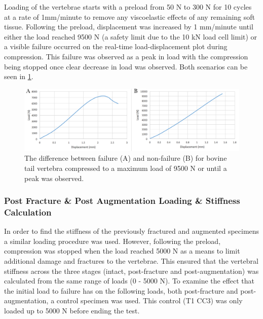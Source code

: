 Loading of the vertebrae starts with a preload from 50 N to 300 N for 10 cycles
at a rate of 1mm/minute to remove any viscoelastic effects of any remaining
soft tissue. Following the preload, displacement was increased by 1 mm/minute
until either the load reached 9500 N (a safety limit due to the 10 kN load cell
limit) or a visible failure occurred on the real-time load-displacement plot
during compression.  This failure was observed as a peak in load with the
compression being stopped once clear decrease in load was observed. Both
scenarios can be seen in \cref{fig:failure_non_failure}.



\begin{figure}[ht!]
\centering
\includegraphics[width=16cm]{images/comparing_failureand_nonfailure.png}
\caption{The difference between failure (A) and non-failure (B) for bovine tail vertebra compressed to a maximum load of 9500 N or until a peak was observed.}
\label{fig:failure_non_failure}
\end{figure}

\subsubsection{Post Fracture \& Post Augmentation Loading \& Stiffness
Calculation}\label{post-fracture-post-vertebroplasty}

In order to find the stiffness of the previously fractured and augmented
specimens a similar loading procedure was used. However, following the preload,
compression was stopped when the load reached 5000 N as a means to limit
additional damage and fractures to the vertebrae. This ensured that the
vertebral stiffness across the three stages (intact, post-fracture and
post-augmentation) was calculated from the same range of loads (0 - 5000 N). To
examine the effect that the initial load to failure has on the following loads,
both post-fracture and post-augmentation, a control specimen was used. This
control (T1 CC3) was only loaded up to 5000 N before ending the test.




